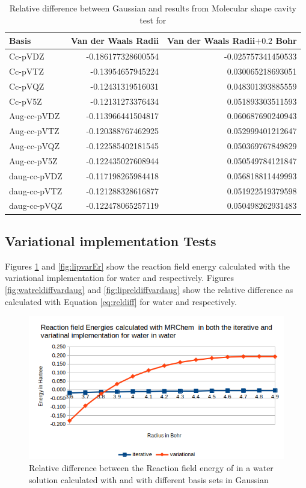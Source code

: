 \documentclass[../master_thesis.tex]{subfiles}
\begin{document}
\begin{table}[htbp]
\caption{Relative difference between Gaussian and \mrchem results from Molecular shape cavity  test for }
\begin{tabular}{l|r|r}
Basis & \multicolumn{1}{l|}{Van der Waals Radii} & \multicolumn{1}{l|}{Van der Waals Radii$+0.2$ Bohr} \\ \hline
Cc-pVDZ & -0.186177328600554 & -0.025757341450533 \\
Cc-pVTZ & -0.13954657945224 & 0.030065218693051 \\
Cc-pVQZ & -0.12431319516031 & 0.048301393885559 \\
Cc-pV5Z & -0.12131273376434 & 0.051893303511593 \\
Aug-cc-pVDZ & -0.113966441504817 & 0.060687690240943 \\
Aug-cc-pVTZ & -0.120388767462925 & 0.052999401212647 \\
Aug-cc-pVQZ & -0.122585402181545 & 0.050369767849829 \\
Aug-cc-pV5Z & -0.122435027608944 & 0.050549784121847 \\
daug-cc-pVDZ & -0.117198265984418 & 0.056818811449993 \\
daug-cc-pVTZ & -0.121288328616877 & 0.051922519379598 \\
daug-cc-pVQZ & -0.122478065257119 & 0.050498262931483 \\
\end{tabular}
\label{tab:acetamidabcreldiff}
\end{table}
\clearpage


\subsection{Variational implementation Tests}
Figures \ref{fig:watvarEr} and \ref{fig:lipvarEr} show the reaction field energy
calculated with the variational implementation for water and 
respectively. Figures \ref{fig:watreldiffvardaug} and \ref{fig:lipreldiffvardaug} show the
relative difference as calculated with Equation \ref{eq:reldiff} for water and 
respectively.

\begin{figure}[!htb]
  \centering
  \includegraphics[width=0.75\linewidth]{img/watvarEr.png}
  \caption{Relative difference between the Reaction field energy of  in a water solution calculated with \mrchem
  and with different basis sets in Gaussian}
  \label{fig:watvarEr}
\end{figure}
\end{document}

